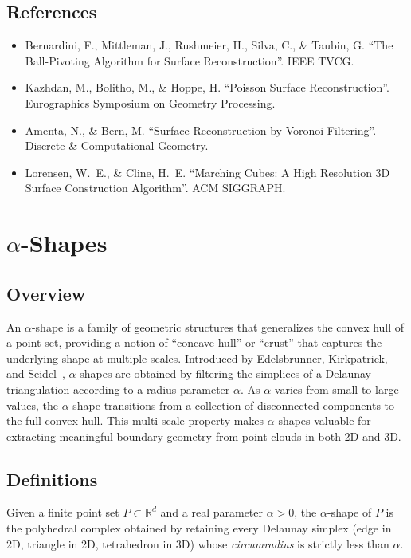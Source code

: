 \subsection{References}
\begin{itemize}
\item Bernardini, F., Mittleman, J., Rushmeier, H., Silva, C., \& Taubin, G. \cite{bernardini1999} ``The Ball-Pivoting Algorithm for Surface Reconstruction''. IEEE TVCG.
\item Kazhdan, M., Bolitho, M., \& Hoppe, H. \cite{kazhdan2006} ``Poisson Surface Reconstruction''. Eurographics Symposium on Geometry Processing.
\item Amenta, N., \& Bern, M. \cite{amenta1998} ``Surface Reconstruction by Voronoi Filtering''. Discrete \& Computational Geometry.
\item Lorensen, W.~E., \& Cline, H.~E. \cite{lorensen1987} ``Marching Cubes: A High Resolution 3D Surface Construction Algorithm''. ACM SIGGRAPH.
\end{itemize}

\section{\texorpdfstring{$\alpha$}{alpha}-Shapes}
\label{sec:alpha_shapes}

\subsection{Overview}
An $\alpha$-shape is a family of geometric structures that generalizes the convex hull of a point set, providing a notion of ``concave hull'' or ``crust'' that captures the underlying shape at multiple scales. Introduced by Edelsbrunner, Kirkpatrick, and Seidel~\cite{edelsbrunner1983}, $\alpha$-shapes are obtained by filtering the simplices of a Delaunay triangulation according to a radius parameter $\alpha$. As $\alpha$ varies from small to large values, the $\alpha$-shape transitions from a collection of disconnected components to the full convex hull. This multi-scale property makes $\alpha$-shapes valuable for extracting meaningful boundary geometry from point clouds in both 2D and 3D.

\subsection{Definitions}
\begin{definition}\label{def:alpha_shape}
Given a finite point set $P \subset \mathbb{R}^d$ and a real parameter $\alpha > 0$, the $\alpha$-shape of $P$ is the polyhedral complex obtained by retaining every Delaunay simplex (edge in 2D, triangle in 2D, tetrahedron in 3D) whose \emph{circumradius} is strictly less than $\alpha$.
\end{definition}

